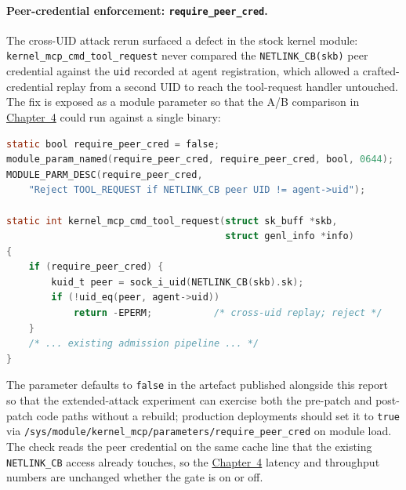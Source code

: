 \paragraph{Peer-credential enforcement: \texttt{require\_peer\_cred}.}

The cross-UID attack rerun surfaced a defect in the stock kernel module: \texttt{kernel\_mcp\_cmd\_tool\_request} never compared the \texttt{NETLINK\_CB(skb)} peer credential against the \texttt{uid} recorded at agent registration, which allowed a crafted-credential replay from a second UID to reach the tool-request handler untouched.
The fix is exposed as a module parameter so that the A/B comparison in \hyperref[chap:evaluation]{Chapter~4} could run against a single binary:

\begin{lstlisting}[style=codestyle, language=C, caption={Peer-credential enforcement patch in \texttt{kernel\_mcp\_main.c}, gated behind the \texttt{require\_peer\_cred} module parameter.}]
static bool require_peer_cred = false;
module_param_named(require_peer_cred, require_peer_cred, bool, 0644);
MODULE_PARM_DESC(require_peer_cred,
    "Reject TOOL_REQUEST if NETLINK_CB peer UID != agent->uid");

static int kernel_mcp_cmd_tool_request(struct sk_buff *skb,
                                       struct genl_info *info)
{
    if (require_peer_cred) {
        kuid_t peer = sock_i_uid(NETLINK_CB(skb).sk);
        if (!uid_eq(peer, agent->uid))
            return -EPERM;           /* cross-uid replay; reject */
    }
    /* ... existing admission pipeline ... */
}
\end{lstlisting}

The parameter defaults to \texttt{false} in the artefact published alongside this report so that the extended-attack experiment can exercise both the pre-patch and post-patch code paths without a rebuild; production deployments should set it to \texttt{true} via \texttt{/sys/\allowbreak module/\allowbreak kernel\_\allowbreak mcp/\allowbreak parameters/\allowbreak require\_\allowbreak peer\_\allowbreak cred} on module load.
The check reads the peer credential on the same cache line that the existing \texttt{NETLINK\_CB} access already touches, so the \hyperref[chap:evaluation]{Chapter~4} latency and throughput numbers are unchanged whether the gate is on or off.

